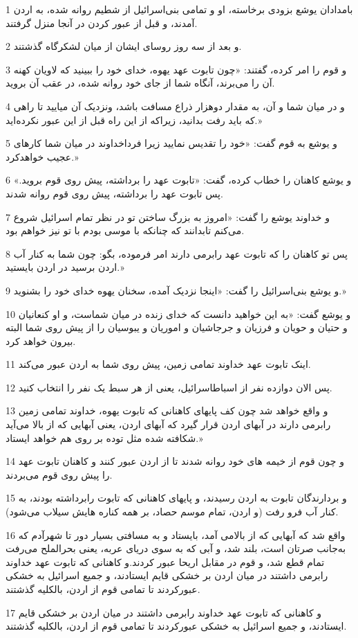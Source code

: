 \par 1 بامدادان یوشع بزودی برخاسته، او و تمامی بنی‌اسرائیل از شطیم روانه شده، به اردن آمدند، و قبل از عبور کردن در آنجا منزل گرفتند.
\par 2 و بعد از سه روز روسای ایشان از میان لشکرگاه گذشتند.
\par 3 و قوم را امر کرده، گفتند: «چون تابوت عهد یهوه، خدای خود را ببینید که لاویان کهنه آن را می‌برند، آنگاه شما از جای خود روانه شده، در عقب آن بروید.
\par 4 و در میان شما و آن، به مقدار دوهزار ذراع مسافت باشد، ونزدیک آن میایید تا راهی که باید رفت بدانید، زیراکه از این راه قبل از این عبور نکرده‌اید.»
\par 5 و یوشع به قوم گفت: «خود را تقدیس نمایید زیرا فرداخداوند در میان شما کارهای عجیب خواهدکرد.»
\par 6 و یوشع کاهنان را خطاب کرده، گفت: «تابوت عهد را برداشته، پیش روی قوم بروید.» پس تابوت عهد را برداشته، پیش روی قوم روانه شدند.
\par 7 و خداوند یوشع را گفت: «امروز به بزرگ ساختن تو در نظر تمام اسرائیل شروع می‌کنم تابدانند که چنانکه با موسی بودم با تو نیز خواهم بود.
\par 8 پس تو کاهنان را که تابوت عهد رابرمی دارند امر فرموده، بگو: چون شما به کنار آب اردن برسید در اردن بایستید.»
\par 9 و یوشع بنی‌اسرائیل را گفت: «اینجا نزدیک آمده، سخنان یهوه خدای خود را بشنوید.»
\par 10 و یوشع گفت: «به این خواهید دانست که خدای زنده در میان شماست، و او کنعانیان و حتیان و حویان و فرزیان و جرجاشیان و اموریان و یبوسیان را از پیش روی شما البته بیرون خواهد کرد.
\par 11 اینک تابوت عهد خداوند تمامی زمین، پیش روی شما به اردن عبور می‌کند.
\par 12 پس الان دوازده نفر از اسباطاسرائیل، یعنی از هر سبط یک نفر را انتخاب کنید.
\par 13 و واقع خواهد شد چون کف پایهای کاهنانی که تابوت یهوه، خداوند تمامی زمین رابرمی دارند در آبهای اردن قرار گیرد که آبهای اردن، یعنی آبهایی که از بالا می‌آید شکافته شده مثل توده بر روی هم خواهد ایستاد.»
\par 14 و چون قوم از خیمه های خود روانه شدند تا از اردن عبور کنند و کاهنان تابوت عهد را پیش روی قوم می‌بردند.
\par 15 و بردارندگان تابوت به اردن رسیدند، و پایهای کاهنانی که تابوت رابرداشته بودند، به کنار آب فرو رفت (و اردن، تمام موسم حصاد، بر همه کناره هایش سیلاب می‌شود).
\par 16 واقع شد که آبهایی که از بالامی آمد، بایستاد و به مسافتی بسیار دور تا شهرآدم که به‌جانب صرتان است، بلند شد، و آبی که به سوی دریای عربه، یعنی بحرالملح می‌رفت تمام قطع شد، و قوم در مقابل اریحا عبور کردند.و کاهنانی که تابوت عهد خداوند رابرمی داشتند در میان اردن بر خشکی قایم ایستادند، و جمیع اسرائیل به خشکی عبورکردند تا تمامی قوم از اردن، بالکلیه گذشتند.
\par 17 و کاهنانی که تابوت عهد خداوند رابرمی داشتند در میان اردن بر خشکی قایم ایستادند، و جمیع اسرائیل به خشکی عبورکردند تا تمامی قوم از اردن، بالکلیه گذشتند.
 
